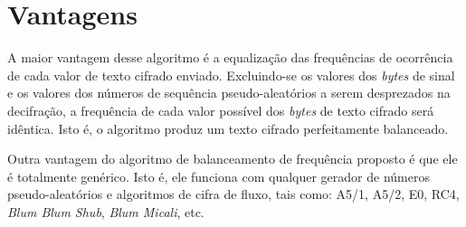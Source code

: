 \section{Vantagens}

A maior vantagem desse algoritmo é a equalização das frequências de ocorrência de cada valor de texto cifrado enviado. Excluindo-se os valores dos \textit{bytes} de sinal e os valores dos números de sequência pseudo-aleatórios a serem desprezados na decifração, a frequência de cada valor possível dos \textit{bytes} de texto cifrado será idêntica. Isto é, o algoritmo produz um texto cifrado perfeitamente balanceado.

Outra vantagem do algoritmo de balanceamento de frequência proposto é que ele é totalmente genérico.  Isto é, ele funciona com qualquer gerador de números pseudo-aleatórios e algoritmos de cifra de fluxo, tais como: A5/1, A5/2, E0, RC4, \textit{Blum Blum Shub}, \textit{Blum Micali}, etc.
